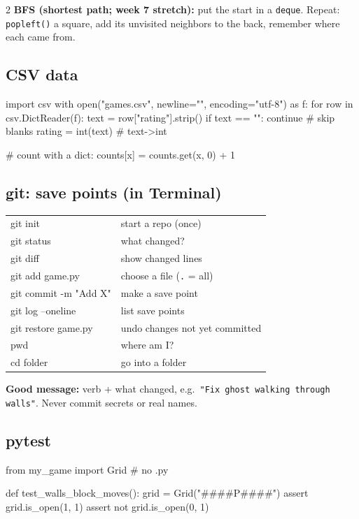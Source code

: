 \documentclass[level=3]{kidscode}
\begin{document}
\begin{multicols}{2}
\textbf{BFS (shortest path; week 7 stretch):} put the start in a \texttt{deque}. Repeat: \texttt{popleft()} a square, add
its unvisited neighbors to the back, remember where each came from.

\subsection{CSV data}
\begin{sheetcode}
import csv
with open("games.csv", newline="",
          encoding="utf-8") as f:
    for row in csv.DictReader(f):
        text = row["rating"].strip()
        if text == "":
            continue      # skip blanks
        rating = int(text)  # text->int

# count with a dict:
counts[x] = counts.get(x, 0) + 1
\end{sheetcode}

\subsection{git: save points (in Terminal)}
\renewcommand{\arraystretch}{1.1}
\begin{tabularx}{\linewidth}{@{}>{\ttfamily}l>{\raggedright\arraybackslash}X@{}}
git init & start a repo (once)\\
git status & what changed?\\
git diff & show changed lines\\
git add game.py & choose a file (\texttt{.} = all)\\
git commit -m "Add X" & make a save point\\
git log --oneline & list save points\\
git restore game.py & undo changes not yet committed\\
pwd & where am I?\\
cd folder & go into a folder\\
\end{tabularx}

\textbf{Good message:} verb + what changed, e.g.\ \texttt{"Fix ghost walking through walls"}.
Never commit secrets or real names.

\subsection{pytest}
\begin{sheetcode}
from my_game import Grid  # no .py

def test_walls_block_moves():
    grid = Grid("###\n#P#\n###")
    assert grid.is_open(1, 1)
    assert not grid.is_open(0, 1)


\end{sheetcode}
\end{multicols}
\end{document}
